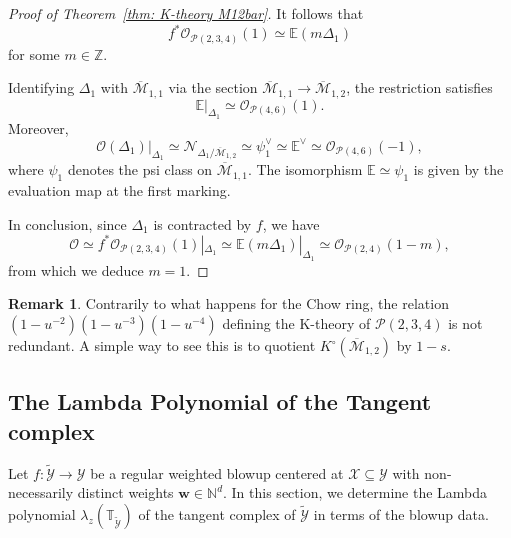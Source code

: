 \documentclass[12pt]{amsart}
\newcommand{\bT}{\mathbb{T}}
\newcommand{\cM}{\mathcal{M}}
\newcommand{\cP}{\mathcal{P}}
\newcommand{\cX}{\mathcal{X}}
\newcommand{\cY}{\mathcal{Y}}
\newcommand{\Kring}{K^{\circ}}
\theoremstyle{definition}
\newtheorem{Rmk}[theorem]{Remark}
\begin{document}
\begin{proof}[Proof of Theorem~\ref{thm: K-theory M12bar}]
It follows that
\[
f^* \mathcal{O}_{\cP(2,3,4)}(1) \simeq \mathbb{E}(m \Delta_1)
\]
for some $m \in \mathbb{Z}$.

Identifying $\Delta_1$ with $\overline{\mathcal{M}}_{1,1}$ via the section $\overline{\mathcal{M}}_{1,1} \to \overline{\mathcal{M}}_{1,2}$, the restriction satisfies
\[
\mathbb{E}|_{\Delta_1} \simeq \mathcal{O}_{\mathcal{P}(4,6)}(1).
\]
Moreover,
\[
\mathcal{O}(\Delta_1)|_{\Delta_1} \simeq \mathcal{N}_{\Delta_1 / \overline{\mathcal{M}}_{1,2}} \simeq \psi_1^\vee \simeq \mathbb{E}^\vee \simeq \mathcal{O}_{\mathcal{P}(4,6)}(-1),
\]
where $\psi_1$ denotes the psi class on $\overline{\mathcal{M}}_{1,1}$. The isomorphism $\mathbb{E} \simeq \psi_1$ is given by the evaluation map at the first marking.

In conclusion, since $\Delta_1$ is contracted by $f$, we have
\[
\mathcal{O} \simeq f^* \mathcal{O}_{\cP(2,3,4)}(1)|_{\Delta_1} \simeq \mathbb{E}(m \Delta_1)|_{\Delta_1} \simeq \mathcal{O}_{\cP(2,4)}(1 - m),
\]
from which we deduce $m = 1$.
\end{proof}

\begin{Rmk}
    Contrarily to what happens for the Chow ring, the relation $(1-u^{-2})(1-u^{-3})(1-u^{-4})$ defining the K-theory of $\cP(2,3,4)$ is not redundant. A simple way to see this is to quotient $\Kring(\overline{\cM}_{1,2})$ by $1-s$. 
\end{Rmk}

\subsection{The Lambda Polynomial of the Tangent complex}\label{sub:lambda-poly}

Let $f:\widetilde{\cY} \to \cY$ be a regular weighted blowup centered at $\cX \subseteq \cY$ with non-necessarily distinct weights $\mathbf{w} \in \mathbb{N}^d$. In this section, we determine the Lambda polynomial $\lambda_z(\bT_{\widetilde{\cY}})$ of the tangent complex of $\widetilde{\cY}$ in terms of the blowup data.
\end{document}
